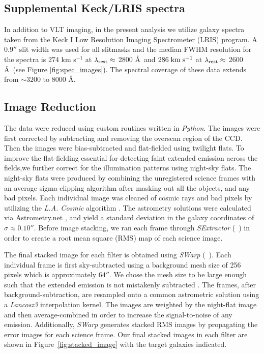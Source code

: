 \documentclass[twocolumn]{aastex61}
\newcommand{\citeth}[1]{(\citeauthor{#1}\ \citeyear{#1})}
\def \mkms {{\rm \; km\;s^{-1}}}
\begin{document}
\subsection{Supplemental Keck/LRIS spectra}
In addition to VLT imaging, in the present analysis we utilize galaxy spectra taken from the \cite{Rubin_2014} Keck I Low Resolution Imaging Spectrometer (LRIS) program.  A $0.9''$ slit width was used for all slitmasks and the median FWHM resolution for the spectra is 274 km s$^{-1}$ at $\lambda_{\rm rest} \approx$ 2800 \AA\ and $286\mkms$  at $\lambda_{\rm rest}\approx$ 2600 \AA\ (see Figure \ref{fig:spec_images}).  The spectral coverage of these data extends from ${\sim}3200$ to 8000 \AA.

\subsection{Image Reduction}
The data were reduced using custom routines written in \emph{Python}. 
The images were first corrected by subtracting and removing the overscan region of the CCD. 
Then the images were bias-subtracted and flat-fielded using twilight flats.
To improve the flat-fielding essential for detecting faint extended emission across the fields,we further correct for the illumination patterns using night-sky flats. The night-sky flats were produced by combining the unregistered science frames with an average sigma-clipping algorithm after masking out all the objects, and any bad pixels. Each individual image was cleaned of cosmic rays and bad pixels by utilizing the \emph{L.A. Cosmic} algorithm \citep{Dokkum2001}.
The astrometry solutions were calculated via Astrometry.net \citep{Lang}, and yield a standard deviation in the galaxy coordinates of $\sigma \approx 0.10''$. Before image stacking, we ran each frame through \emph{SExtractor} \citeth{Bertin} in order to create a root mean square (RMS) map of each science image.


The final stacked image for each filter is obtained using \emph{SWarp} \citeth{Bertin}.
Each individual frame is first sky-subtracted using a background mesh size of 256 pixels which is approximately $64''$. 
We chose the mesh size to be large enough such that the extended emission is not mistakenly subtracted \citep{Battaia_2015}. 
The frames, after background-subtraction, are resampled onto a common astrometric solution using a \textit{Lancosz3} interpolation kernel. 
The images are weighted by the night-flat image and then  average-combined  in order to increase the signal-to-noise of any  emission. Additionally, \emph{SWarp} generates stacked RMS images by propagating the error images for each science frame.
 Our final stacked images in each filter are shown in Figure~\ref{fig:stacked_image} with the target galaxies indicated.  
\end{document}
